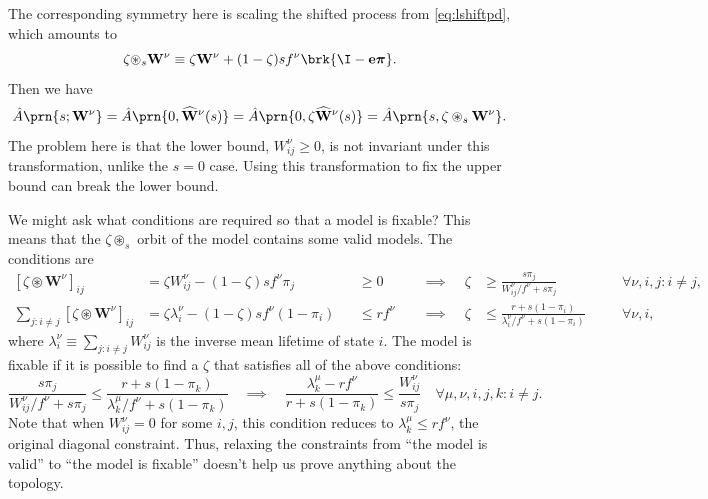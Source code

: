 \documentclass[12pt]{article}
\newcommand{\onev}{\mathbf{e}}
\newcommand{\eqm}{\pi}
\newcommand{\eq}{\boldsymbol{\eqm}}
\newcommand{\lbm}{\lambda}
\newcommand{\Wm}{W}
\newcommand{\W}{\mathbf{\Wm}}
\newcommand{\shift}[1]{\widehat{#1}}
\begin{document}
The corresponding symmetry here is scaling the shifted process from \cref{eq:lshiftpd}, which amounts to
%
\begin{equation}\label{eq:shiftscale}
  \zeta {\circledast}_{s} \W^\nu
      \equiv \zeta \W^\nu
      + (1 - \zeta) s f^\nu \brk{\I - \onev \eq} .
\end{equation}
%
Then we have
%
\begin{equation}\label{eq:lshiftscale}
  \hat{A} \prn{s; \W^\nu} 
    = \hat{A} \prn{0, \shift{\W}^\nu(s)}
    = \hat{A} \prn{0, \zeta \shift{\W}^\nu(s)}
    = \hat{A} \prn{s, \zeta \circledast_s \W^\nu}.
\end{equation}
%
The problem here is that the lower bound, \(\Wm^\nu_{ij} \geq 0\), 
is not invariant under this transformation, unlike the \(s = 0\) case.
Using this transformation to fix the upper bound can break the lower bound.

We might ask what conditions are required so that a model is fixable?
This means that the \(\zeta \circledast_s \) orbit of the model contains some valid models.
The conditions are
%
\begin{equation*}
\begin{alignedat}{5}
  [\zeta \circledast \W^\nu]_{ij}  
    &= \zeta \Wm^\nu_{ij} - (1-\zeta) s f^\nu \eqm_j 
    &&\geq 0 &
  \;\; &\implies \;\; &
  \zeta &\geq \frac{s \eqm_j}{\Wm^\nu_{ij} /  f^\nu + s \eqm_j} &
    &\forall \nu, i, j : i \neq j , \\
  \sum_{j : i \neq j} [\zeta \circledast \W^\nu]_{ij} 
    &= \zeta \lbm^\nu_i - (1-\zeta) s f^\nu (1-\eqm_i) 
    &&\leq r f^\nu &
  &\implies &
  \zeta &\leq \frac{r + s (1-\eqm_i)}{\lbm^\nu_i / f^\nu + s (1-\eqm_i)} &
    \quad &\forall \nu, i ,
\end{alignedat}
\end{equation*}
%
where \(\lbm^\nu_i \equiv \sum_{j : i \neq j} \Wm^\nu_{ij}\) is the inverse mean  lifetime of state \(i\).
The model is fixable if it is possible to find a \(\zeta\) that satisfies all of the above conditions:
%
\begin{equation}\label{eq:fixable}
  \frac{s \eqm_j}{\Wm^\nu_{ij} / f^\nu + s \eqm_j} \leq \frac{r + s (1-\eqm_k)}{\lbm^\mu_k / f^\nu + s (1-\eqm_k)}
  \quad \implies \quad
  \frac{\lbm^\mu_k - r f^\nu}{r + s (1-\eqm_k)} \leq \frac{\Wm^\nu_{ij}}{s \eqm_j} 
  \quad \forall \mu, \nu, i, j, k : i \neq j.
\end{equation}
%
Note that when \(\Wm^\nu_{ij} = 0\) for some \(i,j \), this condition reduces to \(\lbm^\mu_k \leq r f^\nu\), the original diagonal constraint.
Thus, relaxing the constraints from ``the model is valid'' to ``the model is fixable'' doesn't help us prove anything about the topology.
\end{document}
